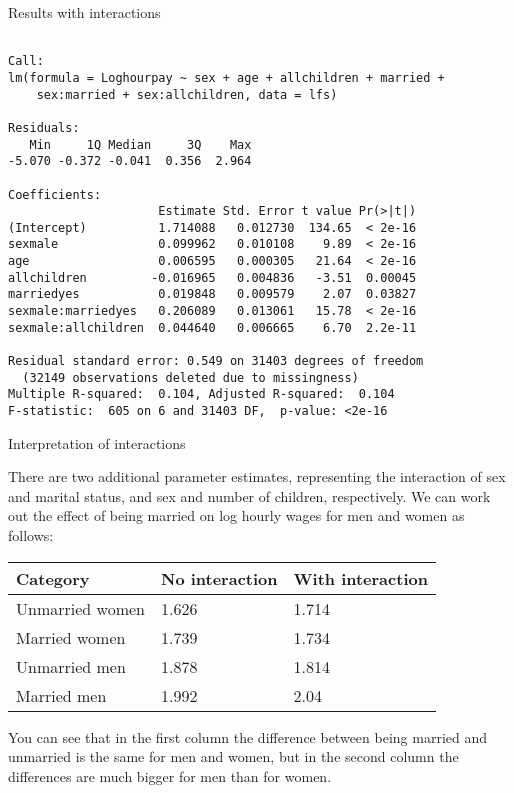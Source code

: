 \documentclass[10pt,ignorenonframetext,]{beamer}
\begin{document}
\begin{frame}[fragile]{Results with interactions}

\footnotesize

\begin{verbatim}

Call:
lm(formula = Loghourpay ~ sex + age + allchildren + married + 
    sex:married + sex:allchildren, data = lfs)

Residuals:
   Min     1Q Median     3Q    Max 
-5.070 -0.372 -0.041  0.356  2.964 

Coefficients:
                     Estimate Std. Error t value Pr(>|t|)
(Intercept)          1.714088   0.012730  134.65  < 2e-16
sexmale              0.099962   0.010108    9.89  < 2e-16
age                  0.006595   0.000305   21.64  < 2e-16
allchildren         -0.016965   0.004836   -3.51  0.00045
marriedyes           0.019848   0.009579    2.07  0.03827
sexmale:marriedyes   0.206089   0.013061   15.78  < 2e-16
sexmale:allchildren  0.044640   0.006665    6.70  2.2e-11

Residual standard error: 0.549 on 31403 degrees of freedom
  (32149 observations deleted due to missingness)
Multiple R-squared:  0.104, Adjusted R-squared:  0.104 
F-statistic:  605 on 6 and 31403 DF,  p-value: <2e-16
\end{verbatim}

\end{frame}

\begin{frame}{Interpretation of interactions}

There are two additional parameter estimates, representing the
interaction of sex and marital status, and sex and number of children,
respectively. We can work out the effect of being married on log hourly
wages for men and women as follows:

\begin{longtable}[]{@{}lll@{}}
\toprule
Category & No interaction & With interaction\tabularnewline
\midrule
\endhead
Unmarried women & 1.626 & 1.714\tabularnewline
Married women & 1.739 & 1.734\tabularnewline
Unmarried men & 1.878 & 1.814\tabularnewline
Married men & 1.992 & 2.04\tabularnewline
\bottomrule
\end{longtable}

You can see that in the first column the difference between being
married and unmarried is the same for men and women, but in the second
column the differences are much bigger for men than for women.

\end{frame}
\end{document}
